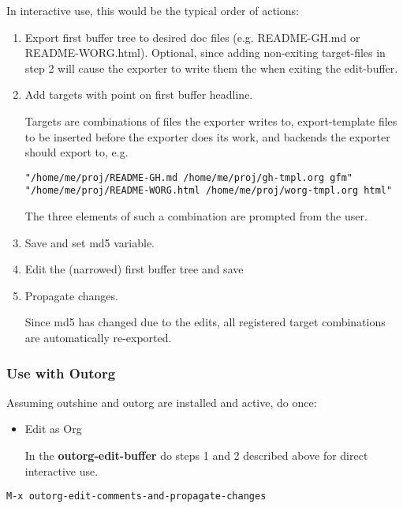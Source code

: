 \documentclass[11pt]{article}
\begin{document}
In interactive use, this would be the typical order of actions:

\begin{enumerate}
\item Export first buffer tree to desired doc files (e.g. README-GH.md
or README-WORG.html). Optional, since adding non-exiting
target-files in step 2 will cause the exporter to write them the
when exiting the edit-buffer.

\item Add targets with point on first buffer headline.

Targets are combinations of files the exporter writes to,
export-template files to be inserted before the exporter does
its work, and backends the exporter should export to, e.g.

\begin{verbatim}
"/home/me/proj/README-GH.md /home/me/proj/gh-tmpl.org gfm"
"/home/me/proj/README-WORG.html /home/me/proj/worg-tmpl.org html"
\end{verbatim}

The three elements of such a combination are prompted from
the user.

\item Save and set md5 variable.

\item Edit the (narrowed) first buffer tree and save

\item Propagate changes.

Since md5 has changed due to the edits, all registered target
combinations are automatically re-exported.
\end{enumerate}
\subsubsection{Use with Outorg}
\label{sec-1-4-3}

Assuming outshine and outorg are installed and active, do once:

\begin{itemize}
\item Edit as Org

In the \textbf{outorg-edit-buffer} do steps 1 and 2 described above
for direct interactive use.
\end{itemize}

\begin{verbatim}
M-x outorg-edit-comments-and-propagate-changes
\end{verbatim}
\end{document}
